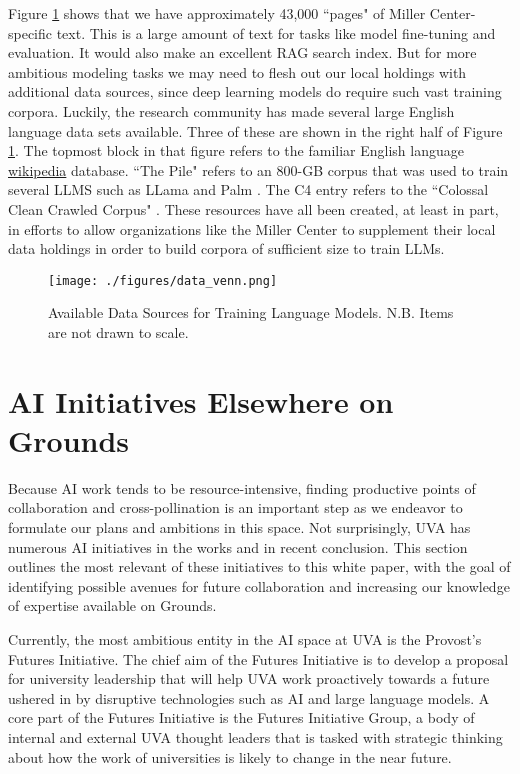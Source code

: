 \documentclass[12pt, oneside]{article}   	%
\begin{document}
Figure \ref{figure.data_venn} shows that we have approximately 43,000 ``pages" of Miller Center-specific text.  This is a large amount of text for tasks like model fine-tuning and evaluation.  It would also make an excellent RAG search index.  But for more ambitious modeling tasks we may need to flesh out our local holdings with additional data sources, since deep learning models do require such vast training corpora.  Luckily, the research community has made several large English language data sets available.  Three of these are shown in the right half of Figure \ref{figure.data_venn}.  The topmost block in that figure refers to the familiar English language \href{en.wikipedia.org}{wikipedia} database.  ``The Pile" refers to an 800-GB corpus that was used to train several LLMS such as LLama and Palm \cite{pile:2020}.  The C4 entry refers to the ``Colossal Clean Crawled Corpus" \cite{c4:2021}.  These resources have all been created, at least in part, in efforts to allow organizations like the Miller Center to supplement their local data holdings in order to build corpora of sufficient size to train LLMs.




\begin{figure}[htbp]
\begin{center}
\texttt{[image: ./figures/data\_venn.png]}
\caption{Available Data Sources for Training Language Models. N.B. Items are not drawn to scale.}
\label{figure.data_venn}
\end{center}
\end{figure}


\section{AI Initiatives Elsewhere on Grounds}\label{section.grounds}
Because AI work tends to be resource-intensive, finding productive points of collaboration and cross-pollination is an important step as we endeavor to formulate our plans and ambitions in this space.  Not surprisingly, UVA has numerous AI initiatives in the works and in recent conclusion.  This section outlines the most relevant of these initiatives to this white paper, with the goal of identifying possible avenues for future collaboration and increasing our knowledge of expertise available on Grounds.

Currently, the most ambitious entity in the AI space at UVA is the Provost’s Futures Initiative.  The chief aim of the Futures Initiative is to develop a proposal for university leadership that will help UVA work proactively towards a future ushered in by disruptive technologies such as AI and large language models.  A core part of the Futures Initiative is the Futures Initiative Group, a body of internal and external UVA thought leaders that is tasked with strategic thinking about how the work of universities is likely to change in the near future.  
\end{document}
